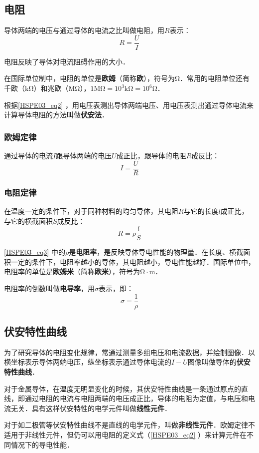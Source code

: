 \subsection{电阻}

导体两端的电压与通过导体的电流之比叫做电阻，用$R$表示：
\begin{equation}\label{HSPE03_eq2}
R=\frac{U}{I}
\end{equation}

电阻反映了导体对电流阻碍作用的大小．

在国际单位制中，电阻的单位是\textbf{欧姆}（简称\textbf{欧}），符号为$\mathrm{\Omega}$．常用的电阻单位还有千欧（$\mathrm{k\Omega}$）和兆欧（$\mathrm{M\Omega}$），$1\mathrm{M\Omega}=10^3\mathrm{k\Omega}=10^6\mathrm{\Omega}$．

根据\autoref{HSPE03_eq2} ，用电压表测出导体两端电压、用电压表测出通过导体电流来计算导体电阻的方法叫做\textbf{伏安法}．

\subsubsection{欧姆定律}

通过导体的电流$I$跟导体两端的电压$U$成正比，跟导体的电阻$R$成反比：
\begin{equation}
I=\frac{U}{R}
\end{equation}

\subsubsection{电阻定律}

在温度一定的条件下，对于同种材料的均匀导体，其电阻$R$与它的长度$l$成正比，与它的横截面积$S$成反比：
\begin{equation}\label{HSPE03_eq3}
R=\rho \frac{l}{S}
\end{equation}

\autoref{HSPE03_eq3} 中的$\rho$是\textbf{电阻率}，是反映导体导电性能的物理量．在长度、横截面积一定的条件下，电阻率越小的导体，其电阻越小，导电性能越好．国际单位中，电阻率的单位是\textbf{欧姆米}（简称\textbf{欧米}），符号为$\mathrm{\Omega\cdot m}$．

电阻率的倒数叫做\textbf{电导率}，用$\sigma$表示，即：
\begin{equation}
\sigma = \frac{1}{\rho}
\end{equation}

\subsection{伏安特性曲线}

为了研究导体的电阻变化规律，常通过测量多组电压和电流数据，并绘制图像．以横坐标表示导体两端电压，纵坐标表示通过导体电流的$I-U$图像叫做导体的\textbf{伏安特性曲线}．

对于金属导体，在温度无明显变化的时候，其伏安特性曲线是一条通过原点的直线，即通过电阻的电流与电阻两端的电压成正比，导体的电阻为定值，与电压和电流无关．具有这样伏安特性的电学元件叫做\textbf{线性元件}．

对于如二极管等伏安特性曲线不是直线的电学元件，叫做\textbf{非线性元件}．欧姆定律不适用于非线性元件，但仍可以用电阻的定义式（\autoref{HSPE03_eq2} ）来计算元件在不同情况下的导电性能．
